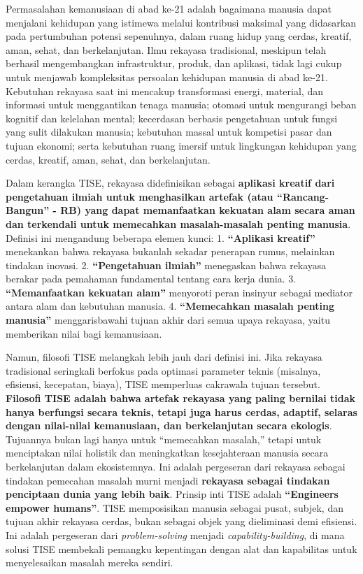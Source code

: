 \documentclass[
  letterpaper,
  DIV=11,
  numbers=noendperiod]{scrreprt}
\begin{document}
Permasalahan kemanusiaan di abad ke-21 adalah bagaimana manusia dapat
menjalani kehidupan yang istimewa melalui kontribusi maksimal yang
didasarkan pada pertumbuhan potensi sepenuhnya, dalam ruang hidup yang
cerdas, kreatif, aman, sehat, dan berkelanjutan. Ilmu rekayasa
tradisional, meskipun telah berhasil mengembangkan infrastruktur,
produk, dan aplikasi, tidak lagi cukup untuk menjawab kompleksitas
persoalan kehidupan manusia di abad ke-21. Kebutuhan rekayasa saat ini
mencakup transformasi energi, material, dan informasi untuk menggantikan
tenaga manusia; otomasi untuk mengurangi beban kognitif dan kelelahan
mental; kecerdasan berbasis pengetahuan untuk fungsi yang sulit
dilakukan manusia; kebutuhan massal untuk kompetisi pasar dan tujuan
ekonomi; serta kebutuhan ruang imersif untuk lingkungan kehidupan yang
cerdas, kreatif, aman, sehat, dan berkelanjutan.

Dalam kerangka TISE, rekayasa didefinisikan sebagai \textbf{aplikasi
kreatif dari pengetahuan ilmiah untuk menghasilkan artefak (atau
``Rancang-Bangun'' - RB) yang dapat memanfaatkan kekuatan alam secara
aman dan terkendali untuk memecahkan masalah-masalah penting manusia}.
Definisi ini mengandung beberapa elemen kunci: 1. \textbf{``Aplikasi
kreatif''} menekankan bahwa rekayasa bukanlah sekadar penerapan rumus,
melainkan tindakan inovasi. 2. \textbf{``Pengetahuan ilmiah''}
menegaskan bahwa rekayasa berakar pada pemahaman fundamental tentang
cara kerja dunia. 3. \textbf{``Memanfaatkan kekuatan alam''} menyoroti
peran insinyur sebagai mediator antara alam dan kebutuhan manusia. 4.
\textbf{``Memecahkan masalah penting manusia''} menggarisbawahi tujuan
akhir dari semua upaya rekayasa, yaitu memberikan nilai bagi
kemanusiaan.

Namun, filosofi TISE melangkah lebih jauh dari definisi ini. Jika
rekayasa tradisional seringkali berfokus pada optimasi parameter teknis
(misalnya, efisiensi, kecepatan, biaya), TISE memperluas cakrawala
tujuan tersebut. \textbf{Filosofi TISE adalah bahwa artefak rekayasa
yang paling bernilai tidak hanya berfungsi secara teknis, tetapi juga
harus cerdas, adaptif, selaras dengan nilai-nilai kemanusiaan, dan
berkelanjutan secara ekologis}. Tujuannya bukan lagi hanya untuk
``memecahkan masalah,'' tetapi untuk menciptakan nilai holistik dan
meningkatkan kesejahteraan manusia secara berkelanjutan dalam
ekosistemnya. Ini adalah pergeseran dari rekayasa sebagai tindakan
pemecahan masalah murni menjadi \textbf{rekayasa sebagai tindakan
penciptaan dunia yang lebih baik}. Prinsip inti TISE adalah
\textbf{``Engineers empower humans''}. TISE memposisikan manusia sebagai
pusat, subjek, dan tujuan akhir rekayasa cerdas, bukan sebagai objek
yang dieliminasi demi efisiensi. Ini adalah pergeseran dari
\emph{problem-solving} menjadi \emph{capability-building}, di mana
solusi TISE membekali pemangku kepentingan dengan alat dan kapabilitas
untuk menyelesaikan masalah mereka sendiri.
\end{document}

